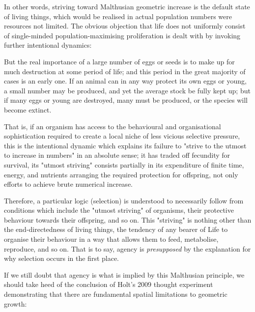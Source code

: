 In other words, striving toward Malthusian geometric increase is the default state of living things, which would be realised in actual population numbers were resources not limited. The obvious objection that life does not uniformly consist of single-minded population-maximising proliferation is dealt with by invoking further intentional dynamics:

\begin{longquote}
But the real importance of a large number of eggs or
seeds is to make up for much destruction at some period of life;
and this period in the great majority of cases is an early one. If
an animal can in any way protect its own eggs or young, a small
number may be produced, and yet the average stock be fully kept
up; but if many eggs or young are destroyed, many must be
produced, or the species will become extinct.
\cite[p.52]{Darwin1888}
\end{longquote}

That is, if an organism has access to the behavioural and organisational sophistication required to create a local niche of less vicious selective pressure, this is the intentional dynamic which explains its failure to "strive to the utmost to increase in numbers" in an absolute sense; it has traded off fecundity for survival, its "utmost striving" consists partially in its expenditure of finite time, energy, and nutrients arranging the required protection for offspring, not only efforts to achieve brute numerical increase.

Therefore, a particular logic (selection) is understood to necessarily follow from conditions which include the "utmost striving" of organisms, their protective behaviour towards their offspring, and so on. This "striving" is nothing other than the end-directedness of living things, the tendency of any bearer of Life to organise their behaviour in a way that allows them to feed, metabolise, reproduce, and so on. That is to say, agency is \textit{presupposed} by the explanation for why selection occurs in the first place.

If we still doubt that agency is what is implied by this Malthusian principle, we should take heed of the conclusion of Holt's 2009 thought experiment demonstrating that there are fundamental spatial limitations to geometric growth:

